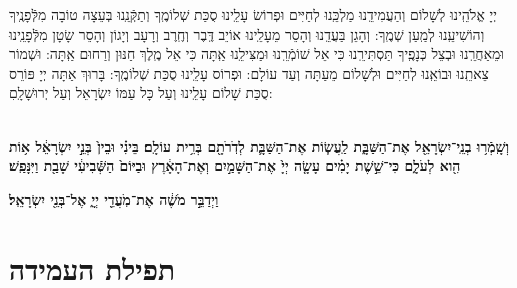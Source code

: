 \documentclass[twoside, openany, parskip=half, 11pt]{book}
\begin{document}
\veahavta

\vehaya 

\vayomer 

\emesveemuna

 יְיָ אֱלֹהֵֽינוּ לְשָׁלוֹם וְהַעֲמִידֵֽנוּ מַלְכֵּֽנוּ לְחַיִּים וּפְרוֹשׂ עָלֵֽינוּ סֻכַּת שְׁלוֹמֶֽךָ וְתַקְּֿנֵֽנוּ בְּעֵצָה טוֹבָה מִלְּֿפָנֶֽיךָ וְהוֹשִׁיעֵֽנוּ לְמַֽעַן שְׁמֶֽךָ: וְהָגֵן בַּעֲדֵֽנוּ וְהָסֵר מֵעָלֵֽינוּ אוֹיֵב דֶּֽבֶר וְחֶֽרֶב וְרָעָב וְיָגוֹן וְהָסֵר שָׂטָן מִלְּֿפָנֵֽינוּ וּמֵאַחֲרֵֽנוּ וּבְצֵל כְּנָפֶֽיךָ תַּסְתִּירֵֽנוּ כִּי אֵל שׁוֹמְֿרֵֽנוּ וּמַצִּילֵֽנוּ אַֽתָּה כִּי אֵל מֶֽלֶךְ חַנּוּן וְרַחוּם אַֽתָּה:  וּשְׁמוֹר צֵאתֵֽנוּ וּבוֹאֵֽנוּ לְחַיִּים וּלְשָׁלוֹם מֵעַתָּה וְעַד עוֹלָם: וּפְרוֹס עָלֵֽינוּ סֻכַּת שְׁלוֹמֶֽךָ: בָּרוּךְ אַתָּה יְיָ פּוֹרֵס סֻכַּת שָׁלוֹם עָלֵֽינוּ וְעַל כָּל עַמּוֹ יִשְׂרָאֵל וְעַל יְרוּשָׁלָֽםִ:

\\
\textbf{
וְשָֽׁמְֿר֥וּ בְנֵֽי־יִשְׂרָאֵ֖ל אֶת־הַשַּׁבָּ֑ת
 לַֽעֲשׂ֧וֹת אֶת־הַשַּׁבָּ֛ת לְדֹֽרֹתָ֖ם בְּרִ֥ית עוֹלָֽם׃ בֵּינִ֗י וּבֵין֙ בְּנֵ֣י יִשְׂרָאֵ֔ל א֥וֹת הִ֖וא לְעֹלָ֑ם כִּי־שֵׁ֣שֶׁת יָמִ֗ים עָשָׂ֤ה יְיָ֙ 
אֶת־הַשָּׁמַ֣יִם וְאֶת־הָאָ֔רֶץ וּבַיּוֹם֙ הַשְּֿׁבִיעִ֔י שָׁבַ֖ת וַיִּנָּפַֽשׁ׃
}

\textbf{
וַיְדַבֵּ֣ר מֹשֶׁ֔ה אֶת־מֹֽעֲדֵ֖י יְיָ֑ אֶל־בְּנֵ֖י יִשְׂרָאֵֽל׃
}



\halfkaddish

 \pageref{tefilasregel}

\section[תפילת העמידה]{ תפילת העמידה }

\newcommand{\shabbosavos}{
 \begin{footnotesize}
אֲ֭דֹנָי שְׂפָתַ֣י תִּפְתָּ֑ח וּ֝פִ֗י יַגִּ֥יד תְּהִלָּתֶֽךָ׃\source{תהלים נא}\\
\end{footnotesize} 
 \firstword{בָּרוּךְ}
 אַתָּה יְיָ אֱלֹהֵֽינוּ וֵאלֹהֵי אֲבוֹתֵֽינוּ אֱלֹהֵי אַבְרָהָם אֱלֹהֵי יִצְחָק וֵאלֹהֵי יַעֲקֹב הָאֵל הַגָּדוֹל הַגִּבּוֹר וְהַנּוֹרָא אֵל עֶלְיוֹן גּוֹמֵל חֲסָדִים טוֹבִים וְקוֹנֵה הַכֹּל וְזוֹכֵר חַסְדֵי אָבוֹת וּמֵבִיא גוֹאֵל לִבְנֵי בְנֵיהֶם לְמַֽעַן שְׁמוֹ בְּאַהֲבָה:

\instruction{בשבת שובה} 
 זָכְרֵֽנוּ לְחַיִּים מֶֽלֶךְ חָפֵץ בַּחַיִּים וְכָתְבֵֽנוּ בְּסֵפֶר הַחַיִּים לְמַעַנְךָ אֱלֹהִים חַיִּים:

מֶֽלֶךְ עוֹזֵר וּמוֹשִֽׁיעַ וּמָגֵן: בָּרוּךְ אַתָּה יְיָ מָגֵן אַבְרָהָם:
}
\end{document}
